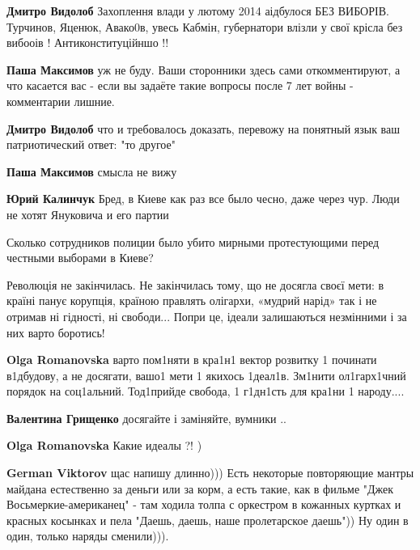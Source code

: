 \begin{itemize}
\begin{itemize}
\textbf{Дмитро Видолоб} Захоплення влади у лютому 2014 аідбулося БЕЗ ВИБОРІВ. Турчинов, Яценюк, Авако0в, увесь Кабмін, губернатори влізли у свої крісла без вибооів ! Антиконституційншо !!

\textbf{Паша Максимов} уж не буду. Ваши сторонники здесь сами откомментируют, а что касается вас - если вы задаёте такие вопросы после 7 лет войны - комментарии лишние.

\textbf{Дмитро Видолоб} что и требовалось доказать, перевожу на понятный язык ваш патриотический ответ: "то другое"

\textbf{Паша Максимов} смысла не вижу

\textbf{Юрий Калинчук} Бред, в Киеве как раз все было чесно, даже через чур. Люди не хотят Януковича и его партии

Сколько сотрудников полиции было убито мирными протестующими перед честными выборами в Киеве?

\end{itemize} %


Революція не закінчилась.  Не закінчилась тому, що не
досягла своєї мети: в країні панує корупція, країною правлять олігархи, «мудрий
нарід» так і не отримав ні гідності, ні свободи... Попри це, ідеали залишаються
незмінними і за них варто боротись!

\begin{itemize} %
\textbf{Olga Romanovska} варто пом1няти в кра1н1 вектор розвитку 1 починати в1дбудову, а не досягати, вашо1 мети 1 якихось 1деал1в. Зм1нити ол1гарх1чний порядок на соц1альний. Тод1прийде свобода, 1 г1дн1сть для кра1ни 1 народу....

\textbf{Валентина Грищенко} досягайте і заміняйте, вумники ..

\textbf{Olga Romanovska} Какие идеалы ?! )

\textbf{German Viktorov} щас напишу длинно)))
Есть некоторые повторяющие мантры майдана естественно за деньги или за корм, а есть такие, как в фильме "Джек Восьмеркие-американец" - там ходила толпа с оркестром в кожанных куртках и красных косынках и пела "Даешь, даешь, наше пролетарское даешь"))
Ну один в один, только наряды сменили))).
\end{itemize} %


\end{itemize}
